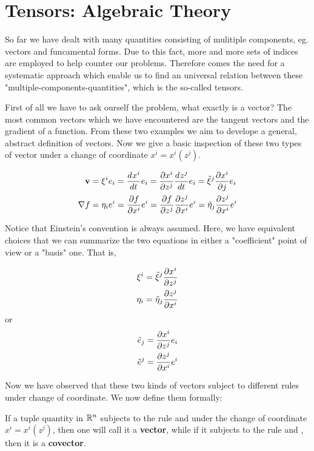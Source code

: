 \section{Tensors: Algebraic Theory}
So far we have dealt with many quantities consisting of mulitiple components, eg. vectors and funcamental forms. Due to this fact, more and more sets of indices are employed to help counter our problems. Therefore comes the need for a systematic approach which enable us to find an universal relation between these "multiple-components-quantities", which is the so-called tensors.

First of all we have to ask ourself the problem, what exactly is a vector? The most common vectors which we have encountered are the tangent vectors and the gradient of a function. From these two examples we aim to develope a general, abstract definition of vectors. Now we give a basic inspection of these two types of vector under a change of coordinate $x^{i} = x^{i}(z^{j})$.

\begin{align}
\mathbf{v} &= \xi^{i}e_i = \frac{d^{} x^i}{d t^{}} e_{i}= \frac{ \partial x^i}{ \partial z^j } \frac{d^{} z^j}{d t^{}} e_i = \tilde{\xi}^j \frac{ \partial x^i}{ \partial j } e_i \\
\nabla f &= \eta_i e^i = \frac{ \partial f}{ \partial x^i }e^i = \frac{ \partial f}{ \partial z^j } \frac{ \partial z^j}{ \partial x^i } e^i = \tilde{\eta}_{j} \frac{ \partial z^j}{ \partial x^i } e^i
\end{align}

Notice that Einstein's convention is always assumed. Here, we have equivalent choices that we can summarize the two equations in either a "coefficient" point of view or a "basis" one. That is,

\begin{align}
	\xi^i &= \tilde{\xi}^j \frac{ \partial x^i}{ \partial z^j } \label{eq:vector_change_coef}\\
	\eta_i&= \tilde{\eta}_j \frac{ \partial z^j}{ \partial x^i } \label{eq:covector_change_coef}
\end{align}
or
\begin{align}
	\tilde{e}_j &= \frac{ \partial x^i}{ \partial z^j } e_i \label{eq:vector_change_basis}\\
	\tilde{e}^j &= \frac{ \partial z^j}{ \partial x^i } e^i \label{eq:covector_change_basis}
\end{align}

Now we have observed that these two kinds of vectors subject to different rules under change of coordinate. We now define them formally:

\begin{definition}
	If a tuple quantity in $\mathbb{R}^n$ subjects to the rule  and  under the change of coordinate $x^i = x^i(z^j)$, then one will call it a \textbf{vector}, while if it subjects to the rule  and , then it is a \textbf{covector}.
\end{definition}

